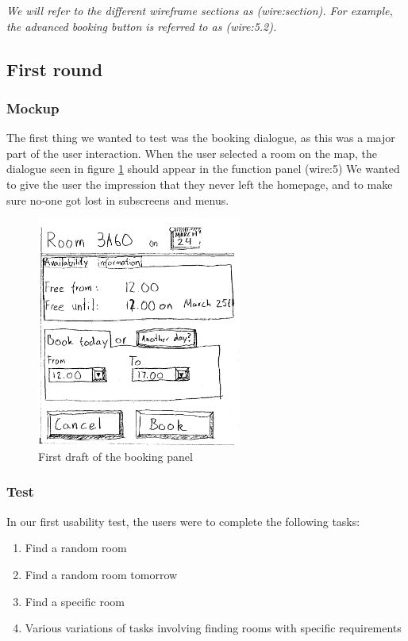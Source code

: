 \emph{We will refer to the different wireframe sections as (wire:section). For example, the advanced booking button is referred to as (wire:5.2).} 

\subsection{First round}
\subsubsection{Mockup}
\label{sub:first_mockup}
The first thing we wanted to test was the booking dialogue, as this was a major part of the user interaction. When the user selected a room on the map, the dialogue seen in figure \ref{fig:book_room_mockup} should appear in the function panel (wire:5)
 We wanted to give the user the impression that they never left the homepage, and to make sure no-one got lost in subscreens and menus.
\begin{figure}[htb]
\begin{center}
\leavevmode
\includegraphics[width=0.6\textwidth]{images/bookRoomMockup}
\end{center}
\caption{First draft of the booking panel}
\label{fig:book_room_mockup}
\end{figure}

\subsubsection{Test}
\label{mock1:test}
In our first usability test, the users were to complete the following tasks:

\begin{enumerate}
	\item Find a random room
	\item Find a random room tomorrow
	\item Find a specific room
	\item Various variations of tasks involving finding rooms with specific requirements
\end{enumerate}

